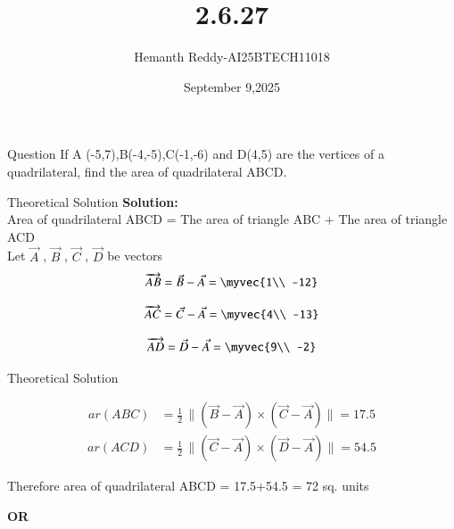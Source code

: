\documentclass{beamer}
\title %
{2.6.27}
\date{September 9,2025}
\author %
{Hemanth Reddy-AI25BTECH11018}
\begin{document}
\frame{\titlepage}
\begin{frame}{Question}
If A (-5,7),B(-4,-5),C(-1,-6) and D(4,5) are the vertices of a quadrilateral, find
 the area of quadrilateral ABCD.
\end{frame}



\begin{frame}{Theoretical Solution}
\textbf{Solution:}\\
Area of quadrilateral ABCD = The area of triangle ABC + The area of triangle ACD\\Let 
$\vec{A}$ ,
$\vec{B}$ ,
$\vec{C}$ ,
$\vec{D}$ 
be vectors\\
\begin{align}
    \overrightarrow{AB} =   \vec{B}  -  \vec{A}  =  \myvec{1\\
-12}
\end{align}

\begin{align}
    \overrightarrow{AC}  =   \vec{C}   -   \vec{A}   =  \myvec{4\\
-13}
\end{align}
 
\begin{align}
    \overrightarrow{AD}  =   \vec{D}   -   \vec{A}   =  \myvec{9\\
-2}
\end{align}
 




\end{frame}

\begin{frame}{Theoretical Solution}

\begin{align}
ar(ABC) &= \frac{1}{2} \, \|(\vec{B} - \vec{A}) \times (\vec{C} - \vec{A}) \|  =  17.5
\end{align}
\begin{align}
ar(ACD) &= \frac{1}{2} \, \|(\vec{C} - \vec{A}) \times (\vec{D} - \vec{A}) \|  =  54.5
\end{align}

Therefore area of quadrilateral ABCD = 17.5+54.5 = 72 sq. units



\begin{center}
    \textbf{OR}
\end{center}
\end{frame}
\end{document}
